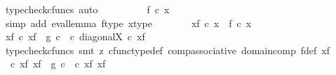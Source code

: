 \begin{isabellebody}
\ {\isacharparenleft}{\kern0pt}typecheck{\isacharunderscore}{\kern0pt}cfuncs{\isacharcomma}{\kern0pt}\ auto{\isacharparenright}{\kern0pt}\isanewline
\ \ \ \ \isamarkupfalse%
\ \isamarkupfalse%
\ {\isachardoublequoteopen}{\isachardot}{\kern0pt}{\isachardot}{\kern0pt}{\isachardot}{\kern0pt}\ {\isacharequal}{\kern0pt}\ f\ {\isasymcirc}\isactrlsub c\ x{\isachardoublequoteclose}\isanewline
\ \ \ \ \ \ \isamarkupfalse%
\ {\isacharparenleft}{\kern0pt}simp\ add{\isacharcolon}{\kern0pt}\ eval{\isacharunderscore}{\kern0pt}lemma\ f{\isacharunderscore}{\kern0pt}type\ x{\isacharunderscore}{\kern0pt}type{\isacharparenright}{\kern0pt}\isanewline
\ \ \ \ \isamarkupfalse%
\ \isamarkupfalse%
\ {\isachardoublequoteopen}{\isasymphi}\isactrlbsub {\isacharbrackleft}{\kern0pt}{\isacharminus}{\kern0pt}{\isacharcomma}{\kern0pt}x{\isacharunderscore}{\kern0pt}f{\isacharbrackright}{\kern0pt}\isactrlesub \ {\isasymcirc}\isactrlsub c\ x\ {\isacharequal}{\kern0pt}\ f\ {\isasymcirc}\isactrlsub c\ x{\isachardoublequoteclose}\isacommand{{\isachardot}{\kern0pt}}\isamarkupfalse%
\isanewline
\ \ \isamarkupfalse%
\isanewline
\ \ \isamarkupfalse%
\ \isamarkupfalse%
\ {\isachardoublequoteopen}{\isasymphi}\isactrlbsub {\isacharbrackleft}{\kern0pt}{\isacharminus}{\kern0pt}{\isacharcomma}{\kern0pt}x{\isacharunderscore}{\kern0pt}f{\isacharbrackright}{\kern0pt}\isactrlesub \ {\isasymcirc}\isactrlsub c\ x{\isacharunderscore}{\kern0pt}f\ {\isacharequal}{\kern0pt}\ g\ {\isasymcirc}\isactrlsub c\ {\isasymphi}\ {\isasymcirc}\isactrlsub c\ diagonal{\isacharparenleft}{\kern0pt}X{\isacharparenright}{\kern0pt}\ {\isasymcirc}\isactrlsub c\ x{\isacharunderscore}{\kern0pt}f{\isachardoublequoteclose}\isanewline
\ \ \ \ \isamarkupfalse%
\ {\isacharparenleft}{\kern0pt}typecheck{\isacharunderscore}{\kern0pt}cfuncs{\isacharcomma}{\kern0pt}\ smt\ {\isacharparenleft}{\kern0pt}z{}{\isacharparenright}{\kern0pt}\ cfunc{\isacharunderscore}{\kern0pt}type{\isacharunderscore}{\kern0pt}def\ comp{\isacharunderscore}{\kern0pt}associative\ domain{\isacharunderscore}{\kern0pt}comp\ f{\isacharunderscore}{\kern0pt}def\ x{\isacharunderscore}{\kern0pt}f{\isacharparenright}{\kern0pt}\isanewline
\ \ \isamarkupfalse%
\ \isamarkupfalse%
\ {\isachardoublequoteopen}{\isasymphi}\ {\isasymcirc}\isactrlsub c\ {\isasymlangle}x{\isacharunderscore}{\kern0pt}f{\isacharcomma}{\kern0pt}\ x{\isacharunderscore}{\kern0pt}f{\isasymrangle}\ {\isacharequal}{\kern0pt}\ g\ {\isasymcirc}\isactrlsub c\ {\isasymphi}\ {\isasymcirc}\isactrlsub c\ {\isasymlangle}x{\isacharunderscore}{\kern0pt}f{\isacharcomma}{\kern0pt}\ x{\isacharunderscore}{\kern0pt}f{\isasymrangle}{\isachardoublequoteclose}\isanewline

\end{isabellebody}
